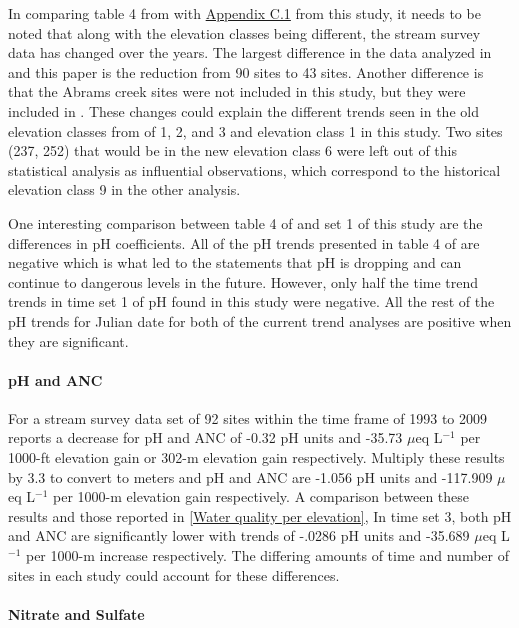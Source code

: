 In comparing table 4 from \citet{robinson2008ph} with \hyperref[sec:SWJD]{Appendix C.1} from this study, it needs to be noted that along with the elevation classes being different, the stream survey data has changed over the years. 
The largest difference in the data analyzed in \citet{robinson2008ph} and this paper is the reduction from 90 sites to 43 sites. 
Another difference is that the Abrams creek sites were not included in this study, but they were included in \citet{robinson2008ph}. 
These changes could explain the different trends seen in the old elevation classes from \citet{robinson2008ph} of 1, 2, and 3 and elevation class 1 in this study. 
Two sites (237, 252) that would be in the new elevation class 6 were left out of this statistical analysis as influential observations, which correspond to the historical elevation class 9 in the other analysis. 

One interesting comparison between table 4 of \citet{robinson2008ph} and set 1 of this study are the differences in pH coefficients. 
All of the pH trends presented in table 4 of \citet{robinson2008ph} are negative which is what led to the statements that pH is dropping and can continue to dangerous levels in the future. 
However, only half the time trend trends in time set 1 of pH found in this study were negative. 
All the rest of the pH trends for Julian date for both of the current trend analyses are positive when they are significant.

\paragraph{pH and ANC}

For a stream survey data set of 92 sites within the time frame of 1993 to 2009 \citet{cai2013} reports a decrease for pH and ANC of -0.32 pH units and -35.73 $\mu$eq L$^{-1}$ per 1000-ft elevation gain or 302-m elevation gain respectively. 
Multiply these results by 3.3 to convert to meters and pH and ANC are -1.056 pH units and -117.909 $\mu$eq L$^{-1}$ per 1000-m elevation gain respectively.
A comparison between these results and those reported in \autoref{Water quality per elevation},
In time set 3,  both pH and ANC are significantly lower with trends of -.0286 pH units and -35.689 $\mu$eq L$^{-1}$  per 1000-m increase respectively.  
The differing amounts of time and number of sites in each study could account for these differences.

\paragraph{Nitrate and Sulfate}

